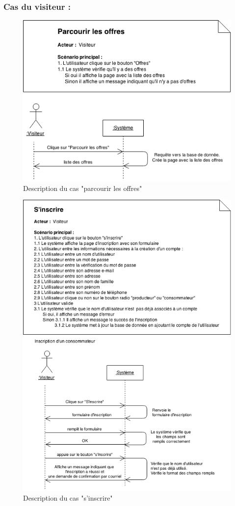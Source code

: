 \documentclass[12pt]{report}
\begin{document}
\subsubsection{Cas du visiteur :}
\begin{figure}[h]
\centering
\includegraphics[width=.8\textwidth]{./ressources/desc_UC_parcourir_offres.png}
\caption{Description du cas "parcourir les offres"}
\end{figure}
\clearpage

\begin{figure}[!H]
\centering
\includegraphics[width=1.\textwidth]{./ressources/desc_UC_inscrire.png}
\caption{Description du cas "s'inscrire"}
\end{figure}
\end{document}
